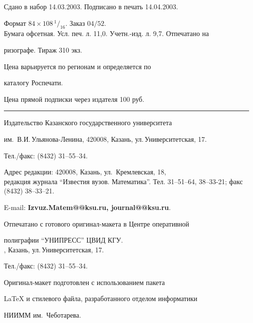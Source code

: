 \noindent Сдано в набор 14.03.2003. Подписано в печать 14.04.2003.


Формат $84\times 108 \,^1/_{16}.$ Заказ $04/52$.\\


Бумага офсетная. Усл. печ. л. 11,0. Учетн.-изд. л. 9,7. Отпечатано на 


ризографе. Тираж 310 экз. 





\noindent Цена варьируется по регионам и определяется по 


каталогу Роспечати. 





\noindent Цена прямой подписки через издателя 100 руб. 


\bigskip


\hrule


\bigskip


\noindent Издательство Казанского государственного университета


им.~В.И.\,Ульянова-Ленина, 420008, Казань, ул.\,Университетская, 17.


Тел./факс: (8432) 31--55--34.\\


\smallskip





\noindent Адрес редакции: 420008, Казань, ул.~Кремлевская, 18,\\  


редакция журнала  ``Известия вузов. Математика''. Тел. 31--51--64, 38--33-21; факс (8432) 38--33--21.





\noindent E-mail: {\bf Izvuz.Matem@@ksu.ru, journal@@ksu.ru}. \par


\bigskip 


\noindent Отпечатано с готового оригинал-макета в Центре оперативной


полиграфии ``УНИПРЕСС'' ЦВИД КГУ. \\





, Казань, ул.\,Университетская, 17.


Тел./факс: (8432) 31--55--34. \par


\bigskip


\noindent Оригинал-макет подготовлен с использованием пакета


\AmS\LaTeX{} и стилевого файла, разработанного отделом информатики


НИИММ им.~Чеботарева.








